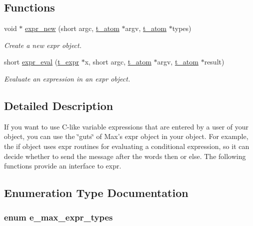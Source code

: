 \subsection*{Functions}
\begin{DoxyCompactItemize}
\item 
void $\ast$ \hyperlink{group__expr_ga7430f6be4bb5d54c7ded0a9ba6b8961f}{expr\_\-new} (short argc, \hyperlink{structt__atom}{t\_\-atom} $\ast$argv, \hyperlink{structt__atom}{t\_\-atom} $\ast$types)
\begin{DoxyCompactList}\small\item\em Create a new expr object. \item\end{DoxyCompactList}\item 
short \hyperlink{group__expr_ga4f0cecc0328fb7598e5a264e9e41c353}{expr\_\-eval} (\hyperlink{structt__expr}{t\_\-expr} $\ast$x, short argc, \hyperlink{structt__atom}{t\_\-atom} $\ast$argv, \hyperlink{structt__atom}{t\_\-atom} $\ast$result)
\begin{DoxyCompactList}\small\item\em Evaluate an expression in an expr object. \item\end{DoxyCompactList}\end{DoxyCompactItemize}


\subsection{Detailed Description}
If you want to use C-\/like variable expressions that are entered by a user of your object, you can use the \char`\"{}guts\char`\"{} of Max’s expr object in your object. For example, the if object uses expr routines for evaluating a conditional expression, so it can decide whether to send the message after the words then or else. The following functions provide an interface to expr. 

\subsection{Enumeration Type Documentation}
\hypertarget{group__expr_ga64f1e232097cbd73318392635e6bab0e}{
\subsubsection[{e\_\-max\_\-expr\_\-types}]{\setlength{\rightskip}{0pt plus 5cm}enum {\bf e\_\-max\_\-expr\_\-types}}}
\label{group__expr_ga64f1e232097cbd73318392635e6bab0e}


